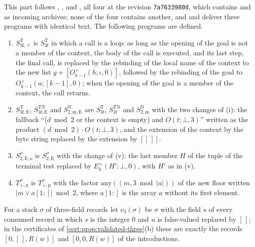 This part follows , ,
 and , all four at the revision
\texttt{7a7633980d}, which contains  and
 as incoming archives; none of the four contains
another, and  and  deliver
three programs with identical text. The following programs are defined.
\begin{enumerate}[label=(\roman*),start=7]
\item $S^{\mathrm T}_{3\mathrm f,\ell}$ is $S^{\mathrm T}_{3\mathrm f}$ in which a
call is a loop: as long as the opening of the goal is not a member of the context,
the body of the call is executed, and its last step, the final call, is replaced by
the rebinding of the local name of the context to the new list
$g+[O^{+}_{k-1}(h;\iota,0)]$, followed by the rebinding of the goal to
$O^{+}_{k-1}(a;[k-1],0)$; when the opening of the goal is a member of the context,
the call returns.
\item $S^{\mathrm T}_{3\mathrm f,\mathrm E}$, $S^{\mathrm{TN}}_{3\mathrm f,\mathrm E}$
and $S^{\mathrm N}_{2,\mathrm{m,E}}$ are $S^{\mathrm T}_{3\mathrm f}$,
$S^{\mathrm{TN}}_{3\mathrm f}$ and $S^{\mathrm N}_{2,\mathrm m}$ with the two changes
of (i): the fallback ``($d\bmod 2$ or the context is empty) and $O(t;\bot,3)$''
written as the product $(d\bmod 2)\cdot O(t;\bot,3)$, and the extension of the
context by the byte string replaced by the extension by $[[\,]]$.
\item $S^{\rho}_{2,\mathrm{E,o}}$ is $S^{\rho}_{2,\mathrm E}$ with the change of (v):
the last member $H$ of the tuple of the terminal test replaced by
$E^{+}_k(H';\bot,0)$, with $H'$ as in (v).
\item $T^{\rho}_{+,\mathrm n}$ is $T^{\rho}_{+,\mathrm p}$ with the factor
$\mathrm{any}((m,3\bmod\lvert a\rvert))$ of the new floor written
$\lvert m\lor a[1{:}]\rvert\bmod 2$, where $a[1{:}]$ is the array $a$ without its
first element.
\end{enumerate}
For a stack $\sigma$ of three-field records let $\nu_3(\sigma)$ be $\sigma$ with the
field $s$ of every consumed record in which $s$ is the integer $0$ and $u$ is
false-valued replaced by $[\,]$; in the certificates of
\cref{cert:prop:validated-three}(b) these are exactly the records $[0,[\,],R(w)]$ and
$[0,0,R(w)]$ of the introductions.

